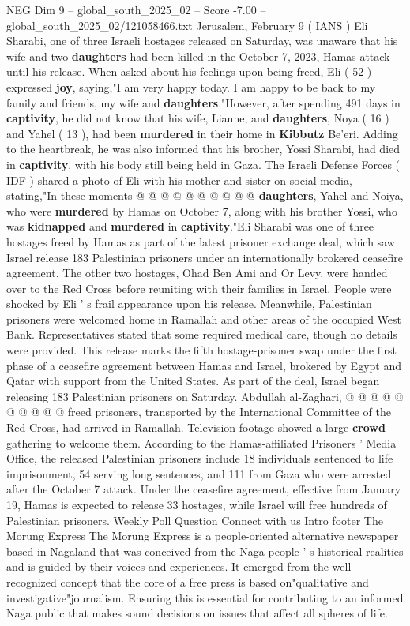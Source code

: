 \begin{textsample}{NEG Dim 9 – global\_south\_2025\_02 – Score -7.00 – global\_south\_2025\_02/121058466.txt}  \label{ex:f9_neg_188}
Jerusalem, February 9 ( IANS ) Eli Sharabi, one of three Israeli hostages released on Saturday, was unaware that his wife and two \textbf{daughters} had been killed in the October 7, 2023, Hamas attack until his release.
When asked about his feelings upon being freed, Eli ( 52 ) expressed \textbf{joy}, saying,"I am very happy today.
I am happy to be back to my family and friends, my wife and \textbf{daughters}."However, after spending 491 days in \textbf{captivity}, he did not know that his wife, Lianne, and \textbf{daughters}, Noya ( 16 ) and Yahel ( 13 ), had been \textbf{murdered} in their home in \textbf{Kibbutz} Be'eri.
Adding to the heartbreak, he was also informed that his brother, Yossi Sharabi, had died in \textbf{captivity}, with his body still being held in Gaza.
The Israeli Defense Forces ( IDF ) shared a photo of Eli with his mother and sister on social media, stating,"In these moments @ @ @ @ @ @ @ @ @ @ \textbf{daughters}, Yahel and Noiya, who were \textbf{murdered} by Hamas on October 7, along with his brother Yossi, who was \textbf{kidnapped} and \textbf{murdered} in \textbf{captivity}."Eli Sharabi was one of three hostages freed by Hamas as part of the latest prisoner exchange deal, which saw Israel release 183 Palestinian prisoners under an internationally brokered ceasefire agreement.
The other two hostages, Ohad Ben Ami and Or Levy, were handed over to the Red Cross before reuniting with their families in Israel.
People were shocked by Eli ' s frail appearance upon his release.
Meanwhile, Palestinian prisoners were welcomed home in Ramallah and other areas of the occupied West Bank.
Representatives stated that some required medical care, though no details were provided.
This release marks the fifth hostage-prisoner swap under the first phase of a ceasefire agreement between Hamas and Israel, brokered by Egypt and Qatar with support from the United States.
As part of the deal, Israel began releasing 183 Palestinian prisoners on Saturday.
Abdullah al-Zaghari, @ @ @ @ @ @ @ @ @ @ freed prisoners, transported by the International Committee of the Red Cross, had arrived in Ramallah.
Television footage showed a large \textbf{crowd} gathering to welcome them.
According to the Hamas-affiliated Prisoners ' Media Office, the released Palestinian prisoners include 18 individuals sentenced to life imprisonment, 54 serving long sentences, and 111 from Gaza who were arrested after the October 7 attack.
Under the ceasefire agreement, effective from January 19, Hamas is expected to release 33 hostages, while Israel will free hundreds of Palestinian prisoners.
Weekly Poll Question Connect with us Intro footer The Morung Express The Morung Express is a people-oriented alternative newspaper based in Nagaland that was conceived from the Naga people ' s historical realities and is guided by their voices and experiences.
It emerged from the well-recognized concept that the core of a free press is based on"qualitative and investigative"journalism.
Ensuring this is essential for contributing to an informed Naga public that makes sound decisions on issues that affect all spheres of life.

\end{textsample}
